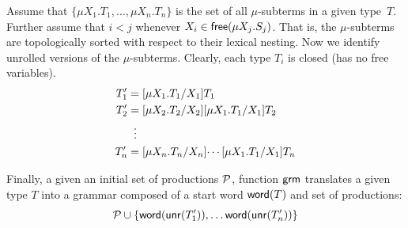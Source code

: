 Assume that $\{\mu X_1.T_1,\dots,\mu X_n.T_n\}$ is the set of all
$\mu$-subterms in a given type~$T$. Further assume that $i<j$ whenever
$X_i \in \mathsf{free}(\mu X_j.S_j)$. That is, the $\mu$-subterms are
topologically sorted with respect to their lexical nesting.
%
Now we identify unrolled versions of the $\mu$-subterms. Clearly, each
type $T_i$ is closed (has no free variables).
%
\begin{align*}
  T_1' &= [{\mu X_1.T_1}/{X_1}]{T_1} \\
  T_2' &= [{\mu X_2.T_2}/{X_2}]{ [{\mu X_1.T_1}/{X_1}]{T_2} }\\
       &\;\;\vdots \\
  T_n' &= [{\mu X_n.T_n}/{X_n}]{ \cdots [{\mu X_1.T_1}/{X_1}]{T_n} }
\end{align*}


Finally, a given an initial set of productions $\mathcal P$,
function $\mathsf{grm}$ translates a given type $T$ into a grammar composed of
a start word $\mathsf{word}(T)$ and set of productions:
%
\begin{equation*}
  \mathcal P \cup \{\mathsf{word}(\mathsf{unr}(T_1')), \dots \mathsf{word}(\mathsf{unr}(T_n'))\}
\end{equation*}


